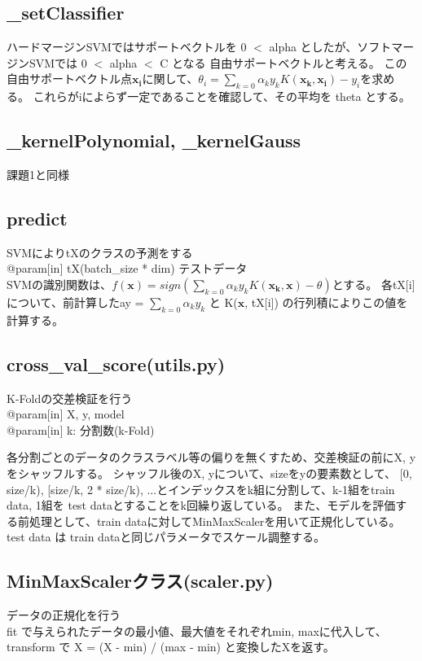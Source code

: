 \documentclass{jsarticle}
\begin{document}
\subsection{\_setClassifier}
ハードマージンSVMではサポートベクトルを 0 $<$ alpha としたが、ソフトマージンSVMでは 0 $<$ alpha $<$ C となる
自由サポートベクトルと考える。
この自由サポートベクトル点$\bm{x_i}$に関して、$\theta_i = \sum_{k=0} \alpha_k y_k K(\bm{x_k}, \bm{x_i}) - y_i$を求める。
これらがiによらず一定であることを確認して、その平均を theta とする。

\subsection*{\_kernelPolynomial, \_kernelGauss}
課題1と同様

\subsection*{predict}
SVMによりtXのクラスの予測をする \\
@param[in] tX(batch\_size * dim) テストデータ \\
SVMの識別関数は、$f(\bm{x}) = sign(\sum_{k=0} \alpha_k y_k K(\bm{x_k}, \bm{x}) - \theta)$とする。
各tX[i]について、前計算したay = $\sum_{k=0} \alpha_k y_k$ と K($\bm{x}$, tX[i]) の行列積によりこの値を計算する。

\subsection*{cross\_val\_score(utils.py)}
K-Foldの交差検証を行う \\
@param[in] X, y, model \\
@param[in] k: 分割数(k-Fold)

各分割ごとのデータのクラスラベル等の偏りを無くすため、交差検証の前にX, yをシャッフルする。
シャッフル後のX, yについて、sizeをyの要素数として、
[0, size/k), [size/k, 2 * size/k), ...とインデックスをk組に分割して、k-1組をtrain data, 1組を
test dataとすることをk回繰り返している。
また、モデルを評価する前処理として、train dataに対してMinMaxScalerを用いて正規化している。test data は
train dataと同じパラメータでスケール調整する。

\subsection*{MinMaxScalerクラス(scaler.py)}
データの正規化を行う \\
fit で与えられたデータの最小値、最大値をそれぞれmin, maxに代入して、
transform で X = (X - min) / (max - min) と変換したXを返す。
\end{document}
